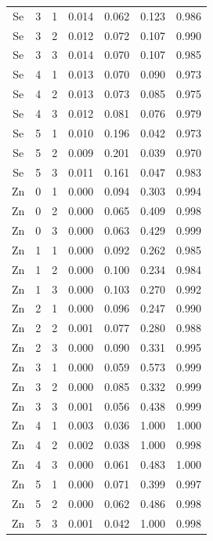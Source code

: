 \documentclass[ms, hidelinks]{uncgdissertationexp}
\theoremstyle{plain}
\theoremstyle{definition}
\theoremstyle{remark}
\begin{document}
\begin{longtable}{ccccccc}
Se & 3 & 1 & 0.014 & 0.062 & 0.123 & 0.986\\
\rowcolor{gray!6}  Se & 3 & 2 & 0.012 & 0.072 & 0.107 & 0.990\\
Se & 3 & 3 & 0.014 & 0.070 & 0.107 & 0.985\\
\rowcolor{gray!6}  Se & 4 & 1 & 0.013 & 0.070 & 0.090 & 0.973\\
Se & 4 & 2 & 0.013 & 0.073 & 0.085 & 0.975\\
\rowcolor{gray!6}  Se & 4 & 3 & 0.012 & 0.081 & 0.076 & 0.979\\
Se & 5 & 1 & 0.010 & 0.196 & 0.042 & 0.973\\
\rowcolor{gray!6}  Se & 5 & 2 & 0.009 & 0.201 & 0.039 & 0.970\\
Se & 5 & 3 & 0.011 & 0.161 & 0.047 & 0.983\\
\rowcolor{gray!6}  Zn & 0 & 1 & 0.000 & 0.094 & 0.303 & 0.994\\
Zn & 0 & 2 & 0.000 & 0.065 & 0.409 & 0.998\\
\rowcolor{gray!6}  Zn & 0 & 3 & 0.000 & 0.063 & 0.429 & 0.999\\
Zn & 1 & 1 & 0.000 & 0.092 & 0.262 & 0.985\\
\rowcolor{gray!6}  Zn & 1 & 2 & 0.000 & 0.100 & 0.234 & 0.984\\
Zn & 1 & 3 & 0.000 & 0.103 & 0.270 & 0.992\\
\rowcolor{gray!6}  Zn & 2 & 1 & 0.000 & 0.096 & 0.247 & 0.990\\
Zn & 2 & 2 & 0.001 & 0.077 & 0.280 & 0.988\\
\rowcolor{gray!6}  Zn & 2 & 3 & 0.000 & 0.090 & 0.331 & 0.995\\
Zn & 3 & 1 & 0.000 & 0.059 & 0.573 & 0.999\\
\rowcolor{gray!6}  Zn & 3 & 2 & 0.000 & 0.085 & 0.332 & 0.999\\
Zn & 3 & 3 & 0.001 & 0.056 & 0.438 & 0.999\\
\rowcolor{gray!6}  Zn & 4 & 1 & 0.003 & 0.036 & 1.000 & 1.000\\
Zn & 4 & 2 & 0.002 & 0.038 & 1.000 & 0.998\\
\rowcolor{gray!6}  Zn & 4 & 3 & 0.000 & 0.061 & 0.483 & 1.000\\
Zn & 5 & 1 & 0.000 & 0.071 & 0.399 & 0.997\\
\rowcolor{gray!6}  Zn & 5 & 2 & 0.000 & 0.062 & 0.486 & 0.998\\
Zn & 5 & 3 & 0.001 & 0.042 & 1.000 & 0.998\\*
\end{longtable}
\clearpage
\end{document}
